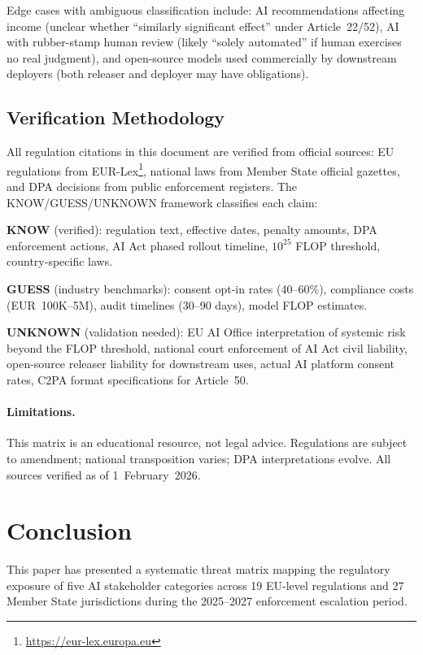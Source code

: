 \documentclass[11pt,a4paper]{article}
\begin{document}
Edge cases with ambiguous classification include: AI recommendations affecting income (unclear whether ``similarly significant effect'' under Article~22/52), AI with rubber-stamp human review (likely ``solely automated'' if human exercises no real judgment), and open-source models used commercially by downstream deployers (both releaser and deployer may have obligations).

\subsection{Verification Methodology}

All regulation citations in this document are verified from official sources: EU regulations from EUR-Lex\footnote{\url{https://eur-lex.europa.eu}}, national laws from Member State official gazettes, and DPA decisions from public enforcement registers. The KNOW/GUESS/UNKNOWN framework classifies each claim:

\textbf{KNOW} (verified): regulation text, effective dates, penalty amounts, DPA enforcement actions, AI Act phased rollout timeline, $10^{25}$ FLOP threshold, country-specific laws.

\textbf{GUESS} (industry benchmarks): consent opt-in rates (40--60\%), compliance costs (EUR~100K--5M), audit timelines (30--90 days), model FLOP estimates.

\textbf{UNKNOWN} (validation needed): EU AI Office interpretation of systemic risk beyond the FLOP threshold, national court enforcement of AI Act civil liability, open-source releaser liability for downstream uses, actual AI platform consent rates, C2PA format specifications for Article~50.

\paragraph{Limitations.}
This matrix is an educational resource, not legal advice. Regulations are subject to amendment; national transposition varies; DPA interpretations evolve. All sources verified as of 1~February~2026.


\section{Conclusion}
\label{sec:conclusion}

This paper has presented a systematic threat matrix mapping the regulatory exposure of five AI stakeholder categories across 19 EU-level regulations and 27 Member State jurisdictions during the 2025--2027 enforcement escalation period.
\end{document}

